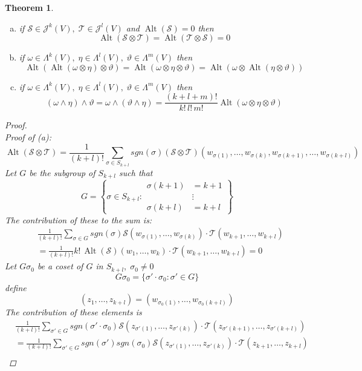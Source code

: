 \documentclass[11pt]{article}
\def\maj{\mathcal{J}}
\def\mat{\mathcal{T}}
\def\mas{\mathcal{S}}
\DeclareMathOperator{\alt}{Alt}
\newtheorem{theorem}{Theorem}[section]
\begin{document}
\begin{theorem}\quad \\
\begin{enumerate}[(a)]
\item if $\mas \in \maj^k(V), \; \mat \in \maj^l(V)$ and $\alt(\mas)=0$ then 
\[\alt(\mas\otimes\mat) = \alt(\mat\otimes\mas)=0\]
\item if $\omega \in \Lambda^k(V), \; \eta \in \Lambda^l(V), \; \vartheta \in \Lambda^m(V)$ then
\[\alt(\alt(\omega\otimes\eta)\otimes\vartheta) = \alt(\omega\otimes\eta\otimes\vartheta) = \alt(\omega\otimes\alt(\eta\otimes\vartheta) )\]
\item if $\omega \in \Lambda^k(V), \; \eta \in \Lambda^l(V), \; \vartheta \in \Lambda^m(V)$ then
\[(\omega\wedge\eta)\wedge\vartheta = \omega\wedge(\vartheta\wedge\eta) = \frac{(k+l+m)!}{k!\,l!\,m!}\alt(\omega\otimes\eta\otimes\vartheta)\]
\end{enumerate}
\begin{proof}\quad \\
Proof of (a): 
\[\alt(\mas\otimes\mat) = \frac{1}{(k+l)!}\sum\limits_{\sigma \in S_{k+l}}sgn(\sigma)(\mas\otimes\mat)(w_{\sigma(1)}, \dots, w_{\sigma(k)}, w_{\sigma(k+1)}, \dots , w_{\sigma(k+l)})\]
Let $G$ be the subgroup of $S_{k+l}$ such that
\[G= \left\{ \sigma \in S_{k+l} : \begin{aligned} \sigma(k+1) &= k+1\\ &\vdots \\ \sigma(k+l) &= k+l \end{aligned} \right\}\]
The contribution of these to the sum is:
\begin{align*}
&\frac{1}{(k+l)!}\sum\limits_{\sigma \in G}sgn(\sigma)\mas(w_{\sigma(1)}, \dots, w_{\sigma(k)})\cdot\mat( w_{k+1}, \dots , w_{k+l})\\
&=\frac{1}{(k+l)!}k!\,\alt(\mas)(w_1, \dots, w_k)\cdot\mat( w_{k+1}, \dots , w_{k+l})=0
\end{align*}
Let $G\sigma_0$ be a coset of $G$ in $S_{k+l}, \; \sigma_0 \neq 0$
\[G\sigma_0 = \{\sigma'\cdot\sigma_0:\sigma' \in G\}\]
define 
\[(z_1, \dots, z_{k+l}) = (w_{\sigma_0(1)}, \dots , w_{\sigma_0(k+l)})\]
The contribution of these elements is
\begin{align*}
&\frac{1}{(k+l)!}\sum\limits_{\sigma' \in G}sgn(\sigma'\cdot\sigma_0)\mas(z_{\sigma'(1)}, \dots, z_{\sigma'(k)})\cdot\mat(z_{\sigma'(k+1)}, \dots, z_{\sigma'(k+l)})\\
&= \frac{1}{(k+l)!}\sum\limits_{\sigma' \in G}sgn(\sigma')sgn(\sigma_0)\mas(z_{\sigma'(1)}, \dots, z_{\sigma'(k)})\cdot\mat(z_{k+1}, \dots, z_{k+l})\\

\end{align*}
\end{proof}
\end{theorem}
\end{document}

